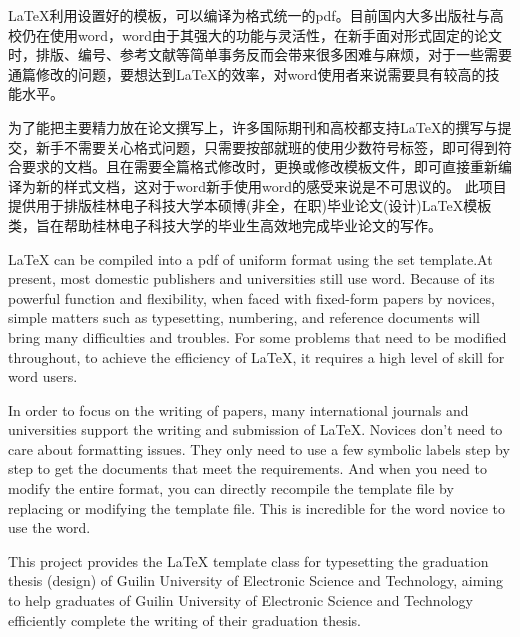 

\begin{chineseabstract}
    LaTeX利用设置好的模板，可以编译为格式统一的pdf。目前国内大多出版社与高校仍在使用word，word由于其强大的功能与灵活性，在新手面对形式固定的论文时，排版、编号、参考文献等简单事务反而会带来很多困难与麻烦，对于一些需要通篇修改的问题，要想达到LaTeX的效率，对word使用者来说需要具有较高的技能水平。

    为了能把主要精力放在论文撰写上，许多国际期刊和高校都支持LaTeX的撰写与提交，新手不需要关心格式问题，只需要按部就班的使用少数符号标签，即可得到符合要求的文档。且在需要全篇格式修改时，更换或修改模板文件，即可直接重新编译为新的样式文档，这对于word新手使用word的感受来说是不可思议的。
    此项目提供用于排版桂林电子科技大学本硕博(非全，在职)毕业论文(设计)LaTeX模板类，旨在帮助桂林电子科技大学的毕业生高效地完成毕业论文的写作。

\end{chineseabstract}


\begin{englishabstract}
    LaTeX can be compiled into a pdf of uniform format using the set template.At present, most domestic publishers and universities still use word. Because of its powerful function and flexibility, when faced with fixed-form papers by novices, simple matters such as typesetting, numbering, and reference documents will bring many difficulties and troubles. For some problems that need to be modified throughout, to achieve the efficiency of LaTeX, it requires a high level of skill for word users.

    In order to focus on the writing of papers, many international journals and universities support the writing and submission of LaTeX. Novices don't need to care about formatting issues. They only need to use a few symbolic labels step by step to get the documents that meet the requirements. And when you need to modify the entire format, you can directly recompile the template file by replacing or modifying the template file. This is incredible for the word novice to use the word.

    This project provides the LaTeX template class for typesetting the graduation thesis (design) of Guilin University of Electronic Science and Technology, aiming to help graduates of Guilin University of Electronic Science and Technology efficiently complete the writing of their graduation thesis.


\end{englishabstract}